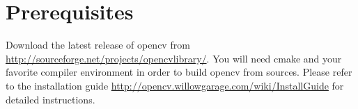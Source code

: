 

\ifCpp
\section{Prerequisites}
Download the latest release of opencv from \url{http://sourceforge.net/projects/opencvlibrary/}. You will need cmake and your favorite compiler environment in order to build opencv from sources. Please refer to the installation guide \url{http://opencv.willowgarage.com/wiki/InstallGuide} for detailed instructions. 

\fi